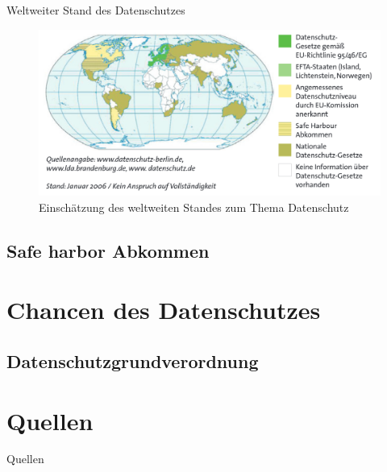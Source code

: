 \documentclass{beamer}
\begin{document}
\begin{frame}{Weltweiter Stand des Datenschutzes}
\begin{figure}[h]
\begin{center}
	\includegraphics[scale=0.3]{datenschutzstand.png}
\end{center}
\caption{Einschätzung des weltweiten Standes zum Thema Datenschutz}
\label{pic:datenschutz}
\end{figure}
\end{frame}

\subsection{Safe harbor Abkommen}
\begin{frame}{}

\end{frame}

\section{Chancen des Datenschutzes}
\begin{frame}{}
\end{frame}


\subsection{Datenschutzgrundverordnung}
\begin{frame}{}

\end{frame}


\section*{Quellen}
\begin{frame}[shrink=10]{Quellen}

 
\end{frame}
\end{document}
